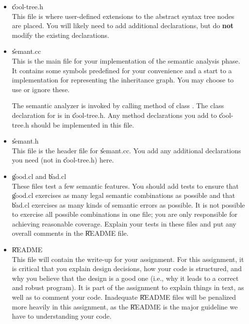 \documentclass[11pt]{article}
\begin{document}
\begin{itemize}

\item \U{cool-tree.h} \\
This file is where user-defined extensions to the abstract syntax
tree nodes are placed.
You will likely
need to add additional declarations, but do {\bf not} modify the
existing declarations.


\item \U{semant.cc} \\
This is the main file for your implementation of the semantic analysis
phase.  It contains some symbols predefined for your convenience and a
start to a  implementation for representing the
inheritance graph.  You may choose to use or ignore these.

The semantic analyzer is invoked by calling method  of
class .  The class declaration for
 is in \U{cool-tree.h}.  Any method declarations you
add to \U{cool-tree.h} should be
implemented in this file.


\item \U{semant.h} \\
This file is the header file for \U{semant.cc}.  You add any
additional declarations you need (not in \U{cool-tree.h})
here.

\item \U{good.cl} and \U{bad.cl} \\
These files test a few semantic features.  You should add tests to
ensure that \U{good.cl} exercises as many legal semantic combinations as
possible and that \U{bad.cl} exercises as many kinds of semantic errors
as possible.  It is not possible to exercise all possible combinations
in one file; you are only responsible for achieving reasonable coverage.
Explain your tests in these files and put any overall comments in the
\U{README} file.

\item \U{README} \\
This file will contain the write-up for your assignment.  For this
assignment, it is critical that you explain design decisions, how your
code is structured, and why you believe that the design is a good one
(i.e., why it leads to a correct and robust program).  It is part of the
assignment to explain things in text, as well as to comment your code.
Inadequate \U{README} files will be penalized more heavily in this
assignment, as the \U{README} is the major guideline we have to
understanding your code.

\end{itemize}
\end{document}
